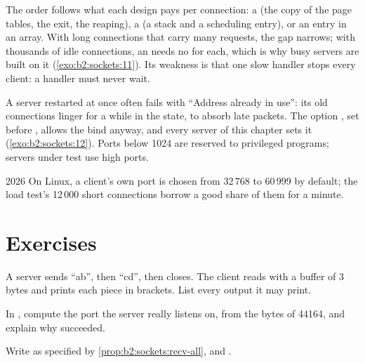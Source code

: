 The order follows what each design pays per connection: a  (the copy of the page tables, the exit, the
reaping), a  (a stack and a scheduling entry), or an entry in an array. With long connections that carry many
requests, the gap narrows; with thousands of idle connections, an  needs no  for each, which is why
busy servers are built on it (\cref{exo:b2:sockets:11}). Its weakness is that one slow handler stops every client: a
handler must never wait.

\begin{inpractice}
A server restarted at once often fails with ``Address already in use'': its old connections linger for a while in the
 state, to absorb late packets. The option , set before , allows the
bind anyway, and every server of this chapter sets it (\cref{exo:b2:sockets:12}). Ports below 1024 are reserved to
privileged programs; servers under test use high ports. %
\begin{dated}{2026}
On Linux, a client's own port is chosen from 32\,768 to 60\,999 by default; the load test's 12\,000 short
connections borrow a good share of them for a minute.
\end{dated}
\end{inpractice}

\section{Exercises}\label{sec:b2:sockets:exercises}

\begin{exercise}[$\star$]\label{exo:b2:sockets:1}
A server sends ``ab'', then ``cd'', then closes. The client reads with a buffer of 3 bytes and prints each piece in
brackets. List every output it may print.
\end{exercise}

\begin{exercise}[$\star$]\label{exo:b2:sockets:2}
In , compute the port the server really listens on, from the bytes of 44164, and explain why
 succeeded.
\end{exercise}

\begin{exercise}[$\star$]\label{exo:b2:sockets:3}
Write  as specified by \cref{prop:b2:sockets:recv-all}, and .
\end{exercise}


